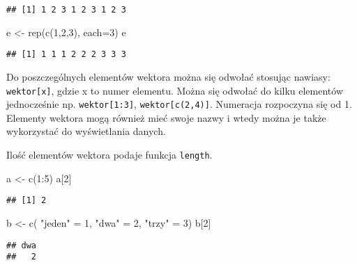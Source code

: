 \documentclass[
]{book}
\newenvironment{Shaded}{\begin{snugshade}}{\end{snugshade}}
\newcommand{\AttributeTok}[1]{\textcolor[rgb]{0.77,0.63,0.00}{#1}}
\newcommand{\DecValTok}[1]{\textcolor[rgb]{0.00,0.00,0.81}{#1}}
\newcommand{\FunctionTok}[1]{\textcolor[rgb]{0.00,0.00,0.00}{#1}}
\newcommand{\NormalTok}[1]{#1}
\newcommand{\OtherTok}[1]{\textcolor[rgb]{0.56,0.35,0.01}{#1}}
\newcommand{\SpecialCharTok}[1]{\textcolor[rgb]{0.00,0.00,0.00}{#1}}
\newcommand{\StringTok}[1]{\textcolor[rgb]{0.31,0.60,0.02}{#1}}
\begin{document}
\begin{verbatim}
## [1] 1 2 3 1 2 3 1 2 3
\end{verbatim}

\begin{Shaded}
\begin{Highlighting}[]
\NormalTok{e }\OtherTok{\textless{}{-}} \FunctionTok{rep}\NormalTok{(}\FunctionTok{c}\NormalTok{(}\DecValTok{1}\NormalTok{,}\DecValTok{2}\NormalTok{,}\DecValTok{3}\NormalTok{), }\AttributeTok{each=}\DecValTok{3}\NormalTok{)}
\NormalTok{e}
\end{Highlighting}
\end{Shaded}

\begin{verbatim}
## [1] 1 1 1 2 2 2 3 3 3
\end{verbatim}

Do poszczególnych elementów wektora można się odwołać stosując nawiasy: \texttt{wektor{[}x{]}}, gdzie x to numer elementu. Można się odwołać do kilku elementów jednocześnie np. \texttt{wektor{[}1:3{]}}, \texttt{wektor{[}c(2,4){]}}. Numeracja rozpoczyna się od 1. Elementy wektora mogą również mieć swoje nazwy i wtedy można je także wykorzystać do wyświetlania danych.

Ilość elementów wektora podaje funkcja \texttt{length}.

\begin{Shaded}
\begin{Highlighting}[]
\NormalTok{a }\OtherTok{\textless{}{-}} \FunctionTok{c}\NormalTok{(}\DecValTok{1}\SpecialCharTok{:}\DecValTok{5}\NormalTok{)}
\NormalTok{a[}\DecValTok{2}\NormalTok{]}
\end{Highlighting}
\end{Shaded}

\begin{verbatim}
## [1] 2
\end{verbatim}

\begin{Shaded}
\begin{Highlighting}[]
\NormalTok{b }\OtherTok{\textless{}{-}} \FunctionTok{c}\NormalTok{( }\StringTok{"jeden"} \OtherTok{=} \DecValTok{1}\NormalTok{, }\StringTok{"dwa"} \OtherTok{=} \DecValTok{2}\NormalTok{, }\StringTok{"trzy"} \OtherTok{=} \DecValTok{3}\NormalTok{)}
\NormalTok{b[}\DecValTok{2}\NormalTok{]}
\end{Highlighting}
\end{Shaded}

\begin{verbatim}
## dwa 
##   2
\end{verbatim}
\end{document}
